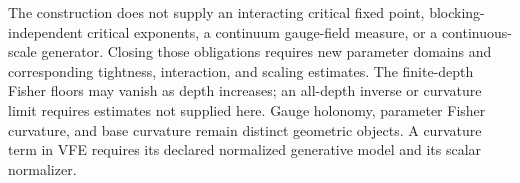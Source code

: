 The construction does not supply an interacting critical fixed point,
blocking-independent critical exponents, a continuum gauge-field measure,
or a continuous-scale generator. Closing those obligations requires new
parameter domains and corresponding tightness, interaction, and scaling
estimates. The finite-depth Fisher floors may vanish as depth increases;
an all-depth inverse or curvature limit requires estimates not supplied
here. Gauge holonomy, parameter Fisher curvature, and base curvature remain
distinct geometric objects. A curvature term in VFE requires its declared
normalized generative model and its scalar normalizer.
